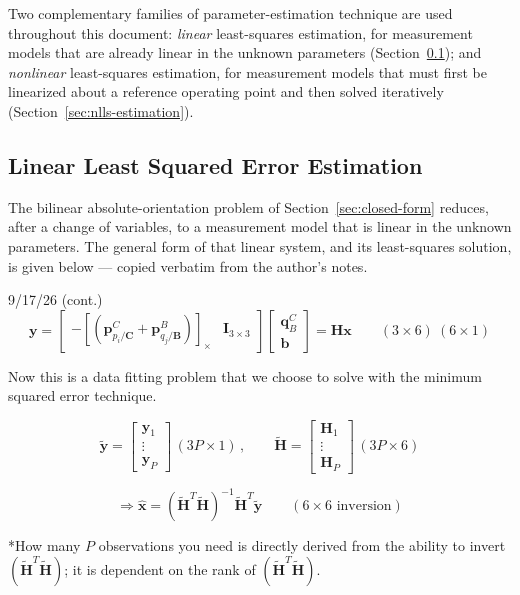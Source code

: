 \documentclass{article}
\newcommand{\vect}[1]{\mathbf{#1}}
\newcommand{\mat}[1]{\mathbf{#1}}
\newcommand{\TCB}{\mat{T}^C_{B}}
\newcommand{\pBjB}{\vect{p}^{\mathit{B}}_{q_{j}/\mathbf{B}}}
\newcommand{\pCiC}{\vect{p}^{\mathit{C}}_{p_{i}/\mathbf{C}}}
\newcommand{\skewop}[1]{\left[#1\right]_{\times}} %
\newcommand{\qCB}{\vect{q}^{C}_{B}} %
\newcommand{\bvec}{\vect{b}} %
\begin{document}
Two complementary families of parameter-estimation technique are used throughout this document: \emph{linear} least-squares estimation, for measurement models that are already linear in the unknown parameters (Section~\ref{sec:linear-lse}); and \emph{nonlinear} least-squares estimation, for measurement models that must first be linearized about a reference operating point and then solved iteratively (Section~\ref{sec:nlls-estimation}).

\subsection{Linear Least Squared Error Estimation}
\label{sec:linear-lse}

The bilinear absolute-orientation problem of Section~\ref{sec:closed-form} reduces, after a change of variables, to a measurement model that is linear in the unknown parameters. The general form of that linear system, and its least-squares solution, is given below --- copied verbatim from the author's notes.

\begin{authornotes}{9/17/26 (cont.)}
\begin{equation}
    \vect{y} = \begin{bmatrix} -\skewop{\left( \pCiC + \pBjB \right)} & \mat{I}_{3\times 3} \end{bmatrix} \begin{bmatrix} \qCB \\ \bvec \end{bmatrix} = \mat{H}\vect{x} \qquad (3\times 6) \ (6 \times 1)
\end{equation}

Now this is a data fitting problem that we choose to solve with the minimum squared error technique.

\begin{equation}
    \tilde{\vect{y}} = \begin{bmatrix} \vect{y}_1 \\ \vdots \\ \vect{y}_P \end{bmatrix} \, (3P \times 1) \, , \qquad \tilde{\mat{H}} = \begin{bmatrix} \mat{H}_1 \\ \vdots \\ \mat{H}_P \end{bmatrix} \, (3P \times 6)
\end{equation}

\begin{equation}
    \Rightarrow \hat{\vect{x}} = \left( \tilde{\mat{H}}^T \tilde{\mat{H}} \right)^{-1} \tilde{\mat{H}}^T \tilde{\vect{y}} \qquad (6 \times 6 \text{ inversion})
    \label{eq:linear-lse-solution}
\end{equation}

*How many $P$ observations you need is directly derived from the ability to invert $\left( \tilde{\mat{H}}^T \tilde{\mat{H}} \right)$; it is dependent on the rank of $\left( \tilde{\mat{H}}^T \tilde{\mat{H}} \right)$.
\end{authornotes}
\end{document}
